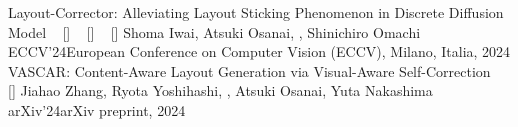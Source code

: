 
\begin{publications}
    \icpublication
    {Layout-Corrector: Alleviating Layout Sticking Phenomenon in Discrete Diffusion Model}
    {
    ~ [\href{https://link.springer.com/chapter/10.1007/978-3-031-72754-2_6}{\small{\doiSymbol}}]
    ~ [\href{https://arxiv.org/abs/2409.16689}{\small{\arxivSymbol}}]
    ~ [\href{https://github.com/line/Layout-Corrector}{\small{\githubSymbol}}]
    }
    {Shoma Iwai, Atsuki Osanai, \underline{}, Shinichiro Omachi}
    {ECCV'24}{European Conference on Computer Vision (ECCV), Milano, Italia, 2024}
    \icpublication
    {VASCAR: Content-Aware Layout Generation via Visual-Aware Self-Correction}
    {
    ~ [\href{https://arxiv.org/abs/2412.04237}{\small{\arxivSymbol}}]
    }
    {Jiahao Zhang, Ryota Yoshihashi, \underline{}, Atsuki Osanai, Yuta Nakashima}
    {arXiv'24}{arXiv preprint, 2024}
\end{publications}

